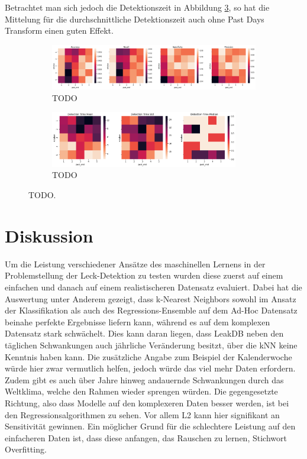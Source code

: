 Betrachtet man sich jedoch die Detektionszeit in Abbildung \ref{fig:res-fe-dt}, so hat die Mittelung für die
 durchschnittliche Detektionszeit auch ohne Past Days Transform einen guten Effekt.

 \begin{figure}
    \centering
    \begin{adjustwidth}{-1cm}{}
        \begin{subfigure}{\textwidth}
            \includegraphics[width=1.3\textwidth]{res/res-fe-metrics}
            \caption{TODO\vspace{1em}}
            \label{fig:res-fe-metrics}
        \end{subfigure}
        \begin{subfigure}{\textwidth}
            \includegraphics[width=0.9\textwidth]{res/res-fe-dt}
            \caption{TODO}
            \label{fig:res-fe-dt}
        \end{subfigure}
        \caption{TODO.}
    \end{adjustwidth}
\end{figure}

\section{Diskussion \label{Chapter-Discussion}}

Um die Leistung verschiedener Ansätze des maschinellen Lernens in der Problemstellung der Leck-Detektion zu
 testen wurden diese zuerst auf einem einfachen und danach auf einem realistischeren Datensatz evaluiert. Dabei
 hat die Auswertung unter Anderem gezeigt, dass k-Nearest Neighbors sowohl im Ansatz der Klassifikation als auch
 des Regressions-Ensemble auf dem Ad-Hoc Datensatz beinahe perfekte Ergebnisse liefern kann, während es auf dem
 komplexen Datensatz stark schwächelt. Dies kann daran liegen, dass LeakDB neben den täglichen Schwankungen
 auch jährliche Veränderung besitzt, über die kNN keine Kenntnis haben kann. Die zusätzliche Angabe zum Beispiel
 der Kalenderwoche würde hier zwar vermutlich helfen, jedoch würde das viel mehr Daten erfordern. Zudem gibt es
 auch über Jahre hinweg andauernde Schwankungen durch das Weltklima, welche den Rahmen wieder sprengen würden.
 Die gegengesetzte Richtung, also dass Modelle auf den komplexeren Daten besser werden, ist bei den
 Regressionsalgorithmen zu sehen. Vor allem L2 kann hier signifikant an Sensitivität gewinnen. Ein möglicher
 Grund für die schlechtere Leistung auf den einfacheren Daten ist, dass diese anfangen, das Rauschen zu lernen,
 Stichwort Overfitting.

